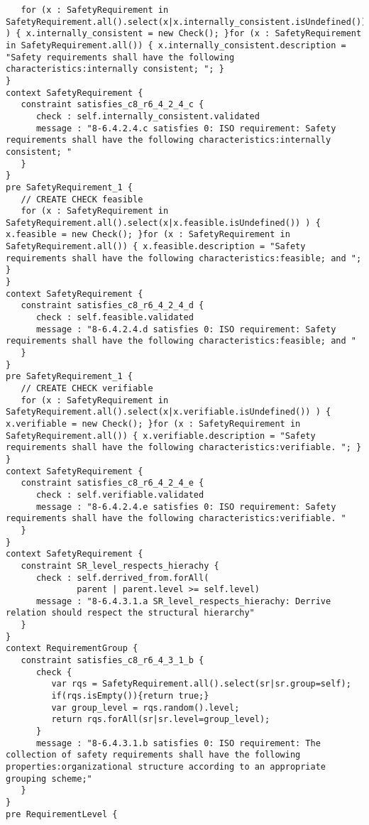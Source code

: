 \documentclass[a4paper]{article}
\begin{document}
\begin{lstlisting}
   for (x : SafetyRequirement in SafetyRequirement.all().select(x|x.internally_consistent.isUndefined()) ) { x.internally_consistent = new Check(); }for (x : SafetyRequirement in SafetyRequirement.all()) { x.internally_consistent.description = "Safety requirements shall have the following characteristics:internally consistent; "; }
}
context SafetyRequirement {
   constraint satisfies_c8_r6_4_2_4_c {
      check : self.internally_consistent.validated
      message : "8-6.4.2.4.c satisfies 0: ISO requirement: Safety requirements shall have the following characteristics:internally consistent; "
   }
}
pre SafetyRequirement_1 {
   // CREATE CHECK feasible
   for (x : SafetyRequirement in SafetyRequirement.all().select(x|x.feasible.isUndefined()) ) { x.feasible = new Check(); }for (x : SafetyRequirement in SafetyRequirement.all()) { x.feasible.description = "Safety requirements shall have the following characteristics:feasible; and "; }
}
context SafetyRequirement {
   constraint satisfies_c8_r6_4_2_4_d {
      check : self.feasible.validated
      message : "8-6.4.2.4.d satisfies 0: ISO requirement: Safety requirements shall have the following characteristics:feasible; and "
   }
}
pre SafetyRequirement_1 {
   // CREATE CHECK verifiable
   for (x : SafetyRequirement in SafetyRequirement.all().select(x|x.verifiable.isUndefined()) ) { x.verifiable = new Check(); }for (x : SafetyRequirement in SafetyRequirement.all()) { x.verifiable.description = "Safety requirements shall have the following characteristics:verifiable. "; }
}
context SafetyRequirement {
   constraint satisfies_c8_r6_4_2_4_e {
      check : self.verifiable.validated
      message : "8-6.4.2.4.e satisfies 0: ISO requirement: Safety requirements shall have the following characteristics:verifiable. "
   }
}
context SafetyRequirement {
   constraint SR_level_respects_hierachy {
      check : self.derrived_from.forAll(
              parent | parent.level >= self.level)
      message : "8-6.4.3.1.a SR_level_respects_hierachy: Derrive relation should respect the structural hierarchy"
   }
}
context RequirementGroup {
   constraint satisfies_c8_r6_4_3_1_b {
      check {
         var rqs = SafetyRequirement.all().select(sr|sr.group=self);
         if(rqs.isEmpty()){return true;}
         var group_level = rqs.random().level;
         return rqs.forAll(sr|sr.level=group_level);
      }
      message : "8-6.4.3.1.b satisfies 0: ISO requirement: The collection of safety requirements shall have the following properties:organizational structure according to an appropriate grouping scheme;"
   }
}
pre RequirementLevel {

\end{lstlisting}
\end{document}
